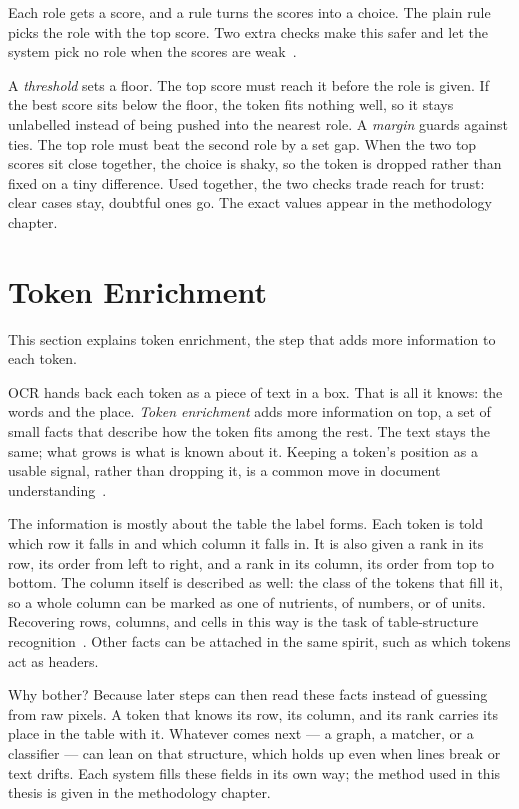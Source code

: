 Each role gets a score, and a rule turns the scores into a choice. The plain rule
picks the role with the top score. Two extra checks make this safer and let the
system pick no role when the scores are weak~\cite{chow1970reject}.

A \emph{threshold} sets a floor. The top score must reach it before the role is
given. If the best score sits below the floor, the token fits nothing well, so it
stays unlabelled instead of being pushed into the nearest role. A \emph{margin}
guards against ties. The top role must beat the second role by a set gap. When the
two top scores sit close together, the choice is shaky, so the token is dropped
rather than fixed on a tiny difference. Used together, the two checks trade reach
for trust: clear cases stay, doubtful ones go. The exact values appear in the
methodology chapter.

\section{Token Enrichment}\label{sec:bgd-enrich}

This section explains token enrichment, the step that adds more information to each
token.

OCR hands back each token as a piece of text in a box. That is all it knows: the
words and the place. \emph{Token enrichment} adds more information on top, a set of
small facts that describe how the token fits among the rest. The text stays the
same; what grows is what is known about it. Keeping a token's position as a usable
signal, rather than dropping it, is a common move in document
understanding~\cite{xu2020layoutlm}.

The information is mostly about the table the label forms. Each token is told which
row it falls in and which column it falls in. It is also given a rank in its row,
its order from left to right, and a rank in its column, its order from top to
bottom. The column itself is described as well: the class of the tokens that fill
it, so a whole column can be marked as one of nutrients, of numbers, or of units.
Recovering rows, columns, and cells in this way is the task of table-structure
recognition~\cite{schreiber2017deepdesrt}. Other facts can be attached in the same
spirit, such as which tokens act as headers.

Why bother? Because later steps can then read these facts instead of guessing from
raw pixels. A token that knows its row, its column, and its rank carries its place
in the table with it. Whatever comes next --- a graph, a matcher, or a classifier
--- can lean on that structure, which holds up even when lines break or text
drifts. Each system fills these fields in its own way; the method used in this
thesis is given in the methodology chapter.

